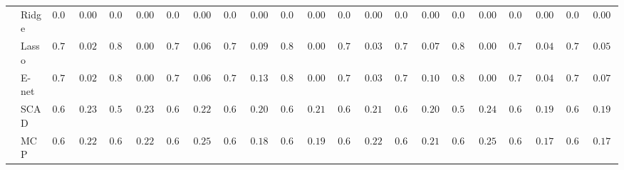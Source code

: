 \begin{tabular}{ll|ll|llllll|llllll|llllll}
 & Ridge  & $0.000$ & $0.0000$ & $0.000$ & $0.0000$ & $0.000$ & $0.0000$ & $0.000$ & $0.0000$ & $0.000$ & $0.0000$ & $0.000$ & $0.0000$ & $0.000$ & $0.0000$ & $0.000$ & $0.0000$ & $0.000$ & $0.0000$ & $0.000$ & $0.0000$ \\
 & Lasso  & $0.798$ & $0.0200$ & $0.800$ & $0.0000$ & $0.786$ & $0.0652$ & $0.758$ & $0.0997$ & $0.800$ & $0.0000$ & $0.794$ & $0.0343$ & $0.770$ & $0.0772$ & $0.800$ & $0.0000$ & $0.796$ & $0.0400$ & $0.790$ & $0.0522$ \\
 & E-net  & $0.798$ & $0.0200$ & $0.800$ & $0.0000$ & $0.784$ & $0.0677$ & $0.732$ & $0.1340$ & $0.800$ & $0.0000$ & $0.792$ & $0.0394$ & $0.754$ & $0.1019$ & $0.800$ & $0.0000$ & $0.796$ & $0.0400$ & $0.784$ & $0.0735$ \\
 & SCAD  & $0.612$ & $0.2306$ & $0.580$ & $0.2370$ & $0.624$ & $0.2243$ & $0.652$ & $0.2082$ & $0.624$ & $0.2114$ & $0.632$ & $0.2197$ & $0.668$ & $0.2014$ & $0.576$ & $0.2483$ & $0.646$ & $0.1904$ & $0.662$ & $0.1984$ \\
 & MCP  & $0.674$ & $0.2232$ & $0.644$ & $0.2267$ & $0.648$ & $0.2544$ & $0.672$ & $0.1875$ & $0.678$ & $0.1926$ & $0.686$ & $0.2261$ & $0.668$ & $0.2150$ & $0.630$ & $0.2580$ & $0.688$ & $0.1783$ & $0.688$ & $0.1783$ \\
\hline 
\end{tabular}

